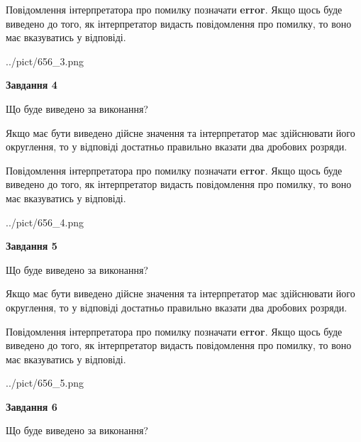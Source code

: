 \documentclass[12pt, ukrainian]{article}
\begin{document}
{\begin {Large}
Повідомлення інтерпретатора про помилку позначати \textbf{error}.
Якщо щось буде виведено до того, як інтерпретатор видасть повідомлення про помилку, 
то воно має вказуватись у відповіді. \par

\begin{center}
	{../pict/656_3.png}
\end{center}
\newpage

{\begin {center}\textbf{Завдання 4}\end {center}}\par
Що буде виведено за виконання? \par

Якщо має бути виведено дійсне значення та інтерпретатор має здійснювати його округлення, 
то у відповіді достатньо правильно вказати два дробових розряди.

Повідомлення інтерпретатора про помилку позначати \textbf{error}.
Якщо щось буде виведено до того, як інтерпретатор видасть повідомлення про помилку, 
то воно має вказуватись у відповіді. \par

\begin{center}
	{../pict/656_4.png}
\end{center}
\newpage

{\begin {center}\textbf{Завдання 5}\end {center}}\par
Що буде виведено за виконання? \par

Якщо має бути виведено дійсне значення та інтерпретатор має здійснювати його округлення, 
то у відповіді достатньо правильно вказати два дробових розряди.

Повідомлення інтерпретатора про помилку позначати \textbf{error}.
Якщо щось буде виведено до того, як інтерпретатор видасть повідомлення про помилку, 
то воно має вказуватись у відповіді. \par

\begin{center}
	{../pict/656_5.png}
\end{center}
\newpage

{\begin {center}\textbf{Завдання 6}\end {center}}\par
Що буде виведено за виконання? \par


\end{Large}}
\end{document}
